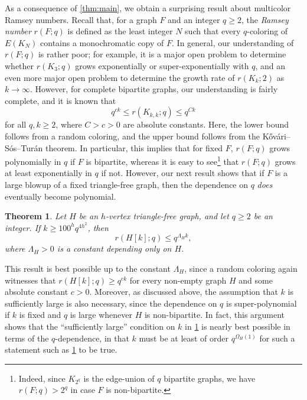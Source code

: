 \documentclass[11pt]{article}
\numberwithin{equation}{section}
\theoremstyle{plain}
\newtheorem{theorem}{Theorem}[section]
\theoremstyle{remark}
\begin{document}
As a consequence of \cref{thm:main}, we obtain a surprising result about multicolor Ramsey numbers. Recall that, for a graph $F$ and an integer $q \geq 2$, the \emph{Ramsey number} $r(F;q)$ is defined as the least integer $N$ such that every $q$-coloring of $E(K_N)$ contains a monochromatic copy of $F$. In general, our understanding of $r(F;q)$ is rather poor; for example, it is a major open problem \cite{MR1815606,MR4357431,MR0177846} to determine whether $r(K_3;q)$ grows exponentially or super-exponentially with $q$, and an even more major open problem \cite{MR366726,MR2552114,MR4548417,2303.09521} to determine the growth rate of $r(K_k;2)$ as $k \to \infty$. However, for complete bipartite graphs, our understanding is fairly complete, and it is known \cite{MR0360329} that
\begin{equation}\label{eq:multicolor K_kk}
    q^{ck} \leq r(K_{k,k};q) \leq q^{Ck}
\end{equation}
for all $q,k \geq 2$, where $C>c>0$ are absolute constants. Here, the lower bound follows from a random coloring, and the upper bound follows from the K\H ov\'ari--S\'os--Tur\'an theorem. In particular, this implies that for fixed $F$,
$r(F;q)$ grows polynomially in $q$ if $F$ is bipartite, whereas it is easy to see\footnote{Indeed, since $K_{2^q}$ is the edge-union of $q$ bipartite graphs, we have $r(F;q)>2^q$ in case $F$ is non-bipartite.}  that $r(F;q)$ grows at least exponentially in $q$ if not. However, our next result shows that if $F$ is a large blowup of a fixed triangle-free graph, then the dependence on $q$ \emph{does} eventually become polynomial.
\begin{theorem}\label{thm:multicolor ramsey}
    Let $H$ be an $h$-vertex triangle-free graph, and let $q \geq 2$ be an integer. If $k \geq 100^h q^{4h^2}$, then
    \[
        r(H[k];q) \leq q^{\Lambda_H k},
    \]
    where $\Lambda_H>0$ is a constant depending only on $H$.
\end{theorem}
This result is best possible up to the constant $\Lambda_H$, since a random coloring again witnesses that $r(H[k];q)\geq q^{ck}$ for every non-empty graph $H$ and some absolute constant $c>0$. Moreover, as discussed above, the assumption that $k$ is sufficiently large is also necessary, since the dependence on $q$ is super-polynomial if $k$ is fixed and $q$ is large whenever $H$ is non-bipartite. In fact, this argument shows that the ``sufficiently large'' condition on $k$ in \cref{thm:multicolor ramsey} is nearly best possible in terms of the $q$-dependence, in that $k$ must be at least of order $q^{\Omega_H(1)}$ for such a statement such as \cref{thm:multicolor ramsey} to be true.
\end{document}
